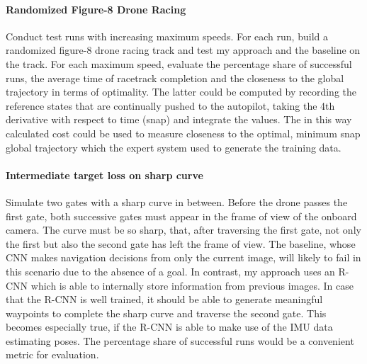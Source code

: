 \paragraph{Randomized Figure-8 Drone Racing}
Conduct test runs with increasing maximum speeds.
For each run,
build a randomized figure-8 drone racing track
and test my approach and the baseline on the track.
For each maximum speed, evaluate the percentage share of successful runs,
the average time of racetrack completion
and the
closeness to the global trajectory in terms of optimality.
The latter could be computed by recording the reference states
that are continually pushed to the autopilot,
taking the 4th derivative with respect to time (snap)
and integrate the values.
The in this way calculated cost could be used to measure closeness to
the optimal, minimum snap global trajectory which the expert system used to generate the 
training data.


\paragraph{Intermediate target loss on sharp curve}
Simulate two gates with a sharp curve in between.
Before the drone passes the first gate,
both successive gates must appear in the frame of view of the onboard camera.
The curve must be so sharp, that, after traversing the first gate, not only the first but also the second gate has left the frame of view.
The baseline, whose CNN makes navigation decisions from only the current image, will likely to fail in this scenario
due to the absence of a goal.
In contrast, my approach uses an R-CNN which is able to internally store information from previous images.
In case that the R-CNN is well trained, it should be able to generate meaningful waypoints to complete the sharp curve and traverse the second gate.
This becomes especially true, if the R-CNN is able to make use of the IMU data estimating poses.
The percentage share of successful runs would be a convenient metric for evaluation.








